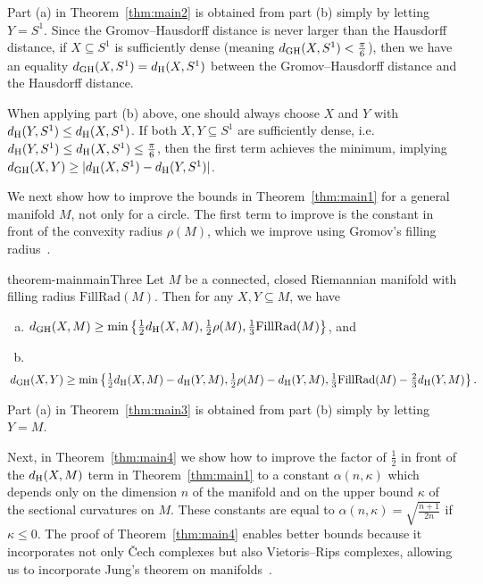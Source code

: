 \documentclass[11pt, reqno, english]{amsart}
\def\fr{\mathrm{FillRad}}
\begin{document}
Part (a) in Theorem~\ref{thm:main2} is obtained from part (b) simply by letting $Y=S^1$.
Since the Gromov--Hausdorff distance is never larger than the Hausdorff distance, if $X\subseteq S^1$ is sufficiently dense (meaning $d_{\mathrm{GH}}(X,S^1)<\tfrac{\pi}{6}$), then we have an equality $d_{\mathrm{GH}}(X,S^1)=d_{\mathrm{H}}(X,S^1)$ between the Gromov--Hausdorff distance and the Hausdorff distance.

When applying part (b) above, one should always choose $X$ and $Y$ with $d_{\mathrm{H}}(Y,S^1)\le d_{\mathrm{H}}(X,S^1)$. 
If both $X,Y\subseteq S^1$ are sufficiently dense, i.e.\ $d_{\mathrm{H}}(Y,S^1) \le d_{\mathrm{H}}(X,S^1) \le \frac{\pi}{6}$, then the first term achieves the minimum, implying $d_{\mathrm{GH}}(X,Y) \ge |d_{\mathrm{H}}(X,S^1)-d_{\mathrm{H}}(Y,S^1)|$.

We next show how to improve the bounds in Theorem~\ref{thm:main1} for a general manifold $M$, not only for a circle.
The first term to improve is the constant in front of the convexity radius $\rho(M)$, which we improve using Gromov's filling radius~\cite{gromov1983filling,lim2020vietoris}.

\vspace{3mm}
\begin{restatable}{theorem-main}{mainThree}
\label{thm:main3}
Let $M$ be a connected, closed Riemannian manifold with filling radius $\fr(M)$.
Then for any $X,Y\subseteq M$, we have
\begin{enumerate}[(a)]
\item $d_\gh(X,M) \ge \min\left\{\tfrac{1}{2}d_\h(X,M), \tfrac{1}{2}\rho(M), \tfrac{1}{3}\fr(M)\right\}$, and
\item \ 
\small
\[\hspace{-6mm}d_\gh(X,Y) \ge \min\left\{\tfrac{1}{2}d_\h(X,M)-d_\h(Y,M), \tfrac{1}{2}\rho(M)-d_\h(Y,M), \tfrac{1}{3}\fr(M)-\tfrac{2}{3}d_\h(Y,M)\right\}.\]
\normalsize
\end{enumerate}
\end{restatable}
\vspace{3mm}

Part (a) in Theorem~\ref{thm:main3} is obtained from part (b) simply by letting $Y=M$.

Next, in Theorem~\ref{thm:main4} we show how to improve the factor of $\frac{1}{2}$ in front of the $d_{\mathrm{H}}(X,M)$ term in Theorem~\ref{thm:main1} to a constant $\alpha(n,\kappa)$ which depends only on the dimension $n$ of the manifold and on the upper bound $\kappa$ of the sectional curvatures on $M$.
These constants are equal to $\alpha(n,\kappa)=\sqrt{\tfrac{n+1}{2n}}$ if $\kappa\leq0$.
The proof of Theorem~\ref{thm:main4} enables better bounds because it incorporates not only \v{C}ech complexes but also Vietoris--Rips complexes, allowing us to incorporate Jung's theorem on manifolds~\cite{danzer1963helly,Dekster1985AnEO,Dekster1995TheJT,Dekster1997}.
\end{document}
